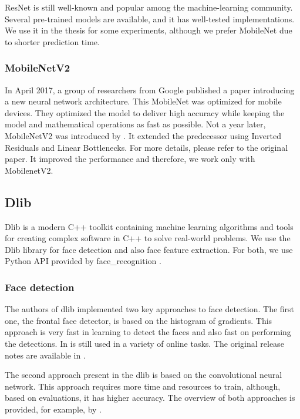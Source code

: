 ResNet is still well-known and popular among the machine-learning community. Several pre-trained models are available, and it has well-tested implementations. We use it in the thesis for some experiments, although we prefer MobileNet due to shorter prediction time.

\subsubsection*{MobileNetV2}

In April 2017, a group of researchers from Google published a paper \citep{mobilenet} introducing a new neural network architecture. This MobileNet was optimized for mobile devices. They optimized the model to deliver high accuracy while keeping the model and mathematical operations as fast as possible. Not a year later, MobileNetV2 was introduced by \cite{mobilenetv2}. It extended the predecessor using Inverted Residuals and Linear Bottlenecks. For more details, please refer to the original paper. It improved the performance and therefore, we work only with MobilenetV2.


\subsection{Dlib}
\label{s:dlib}

Dlib \citep{king2009dlib} is a modern C++ toolkit containing machine learning algorithms and tools for creating complex software in C++ to solve real-world problems. We use the Dlib library for face detection and also face feature extraction. For both, we use Python API provided by face\_recognition \citep{geitgey2016machine}. 

\subsubsection*{Face detection}

The authors of dlib implemented two key approaches to face detection. The first one, the frontal face detector, is based on the histogram of gradients. This approach is very fast in learning to detect the faces and also fast on performing the detections. In is still used in a variety of online tasks. The original release notes are available in \citep{king2017dlib_hog}.

The second approach present in the dlib is based on the convolutional neural network. This approach requires more time and resources to train, although, based on evaluations, it has higher accuracy. The overview of both approaches is provided, for example, by \citep{arun2018cnndlib}.

